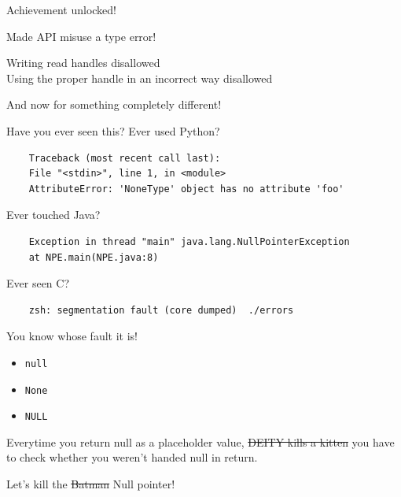 \documentclass{beamer}
\begin{document}
\begin{frame}{Achievement unlocked!}
  \begin{center}
    {\Huge Made API misuse a type error!}
  \end{center}
  \checkmark Writing read handles disallowed\\
  \checkmark Using the proper handle in an incorrect way disallowed
\end{frame}

\begin{frame}
  \begin{center}
    {\Huge And now for something completely different!}
  \end{center}
\end{frame}

\begin{frame}[fragile]{Have you ever seen this?}
  Ever used Python?
  \begin{verbatim}
    Traceback (most recent call last):
    File "<stdin>", line 1, in <module>
    AttributeError: 'NoneType' object has no attribute 'foo'
  \end{verbatim}
  \pause
  Ever touched Java?
  \begin{verbatim}
    Exception in thread "main" java.lang.NullPointerException
    at NPE.main(NPE.java:8)
  \end{verbatim}
  \pause
  Ever seen C?
  \begin{verbatim}
    zsh: segmentation fault (core dumped)  ./errors
  \end{verbatim}
\end{frame}

\begin{frame}{You know whose fault it is!}
  \begin{itemize}
    \item \texttt{null}
    \item \texttt{None}
    \item \texttt{NULL}
  \end{itemize}
  \pause
  Everytime you return null as a placeholder value,
  \sout{\textdollar{}DEITY kills a kitten}
  you have to check whether you weren't handed null in return.
\end{frame}

\begin{frame}
  \begin{center}
    {\Huge Let's kill the \sout{Batman} Null pointer!}
  \end{center}
\end{frame}
\end{document}
